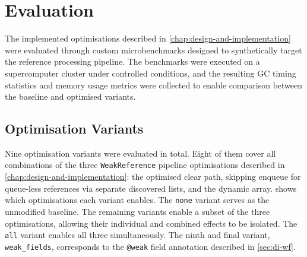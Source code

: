 \chapter{Evaluation}
\label{chap:evaluation}

The implemented optimisations described in \cref{chap:design-and-implementation} were evaluated through custom microbenchmarks designed to synthetically target the reference processing pipeline. The benchmarks were executed on a supercomputer cluster under controlled conditions, and the resulting \ac{GC} timing statistics and memory usage metrics were collected to enable comparison between the baseline and optimised variants.

\section{Optimisation Variants}
\label{sec:eval-variants}

Nine optimisation variants were evaluated in total. Eight of them cover all combinations of the three \texttt{WeakReference} pipeline optimisations described in \cref{chap:design-and-implementation}: the optimised clear path, skipping enqueue for queue-less references via separate discovered lists, and the dynamic array.  shows which optimisations each variant enables. The \texttt{none} variant serves as the unmodified baseline. The remaining variants enable a subset of the three optimisations, allowing their individual and combined effects to be isolated. The \texttt{all} variant enables all three simultaneously. The ninth and final variant, \texttt{weak\_fields}, corresponds to the \texttt{@weak} field annotation described in \cref{sec:di-wf}.

